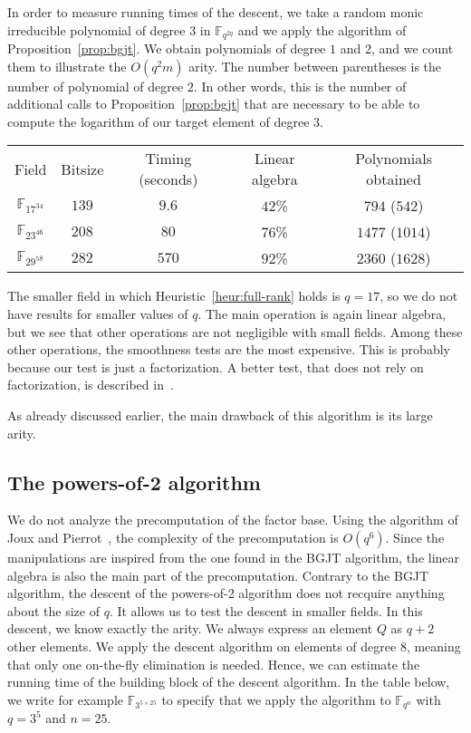 \documentclass[a4paper,11pt]{article}
\theoremstyle{break}
\theoremstyle{sc}
\theoremstyle{definition}
\theoremstyle{remark}
\begin{document}
In order to measure running times of the descent, we take a random monic
irreducible polynomial of degree $3$ in $\mathbb{F}_{q^{2q}}$ and we apply the
algorithm of Proposition~\ref{prop:bgjt}. We obtain polynomials of degree $1$
and $2$, and we count them to illustrate the $O(q^2m)$ arity. The number between
parentheses is the number of polynomial of degree $2$. In other words, this is
the number of additional calls to Proposition~\ref{prop:bgjt} that are necessary to be able to
compute the logarithm of our target element of degree $3$.

\begin{center}
\begin{tabular}[here]{ccccc}
  Field & Bitsize & Timing (seconds) & Linear algebra & Polynomials obtained \\
  $\mathbb{F}_{17^{34}}$ & $139$ & $9.6$ & $42$\% & $794$ ($542$)\\
  $\mathbb{F}_{23^{46}}$ & $208$ & $80$ & $76$\% & $1477$ ($1014$) \\
  $\mathbb{F}_{29^{58}}$ & $282$ & $570$ & $92$\% & $2360$ ($1628$) \\
\end{tabular}
\end{center}

The smaller field in which Heuristic~\ref{heur:full-rank} holds is $q=17$, so we
do not have results for smaller values of $q$. The main operation is again
linear algebra, but we see that other operations are not negligible with small
fields. Among these other operations, the smoothness tests are the most
expensive. This is probably because our test is just a factorization. A better
test, that does not rely on factorization, is described in~\cite{Adj16}.

As already discussed earlier, the main drawback of this algorithm is its large
arity. 

\subsection{The powers-of-2 algorithm}

We do not analyze the precomputation of the factor base. Using the algorithm of
Joux and Pierrot~\cite{JP14}, the complexity of the precomputation is $O(q^6)$.
Since the manipulations are inspired from the one found in the BGJT
algorithm, the linear algebra is also the main part of the precomputation.
Contrary to the BGJT algorithm, the descent of the powers-of-2 algorithm does not recquire anything about the
size of $q$. It allows us to test the descent in smaller fields. In this
descent, we know exactly the arity. We always express an element $Q$ as $q+2$
other elements. We apply the descent algorithm on elements of degree $8$,
meaning that only one on-the-fly elimination is needed. Hence, we can estimate
the running time of the building block of the descent algorithm. In the table
below, we write for example $\mathbb{F}_{3^{5\times25}}$ to specify that we
apply the algorithm to $\mathbb{F}_{q^n}$ with $q=3^5$ and $n = 25$.
\end{document}
